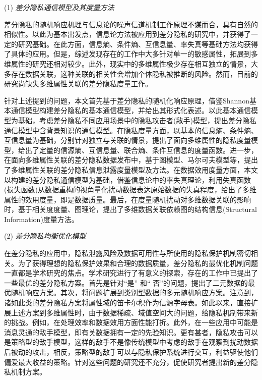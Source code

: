 (1) {\em 差分隐私通信模型及其度量方法}

差分隐私的随机响应机理与信息论的噪声信道机制工作原理不谋而合，具有自然的相似性。以此为基本出发点，信息论方法被应用到差分隐私的研究中，并获得了一定的研究基础。在此方面，信息熵、条件熵、互信息量、率失真等基础方法均获得了具体的应用。但是，综述发现存在的工作中大多针对单一的敏感属性，拓展到多维属性的研究还相对较少。此外，现实中的多维属性极少存在相互独立的情景，大多存在数据关联，这种关联的相关性会增加个体隐私被推断的风险。然而，目前的研究尚缺失多维属性关联的差分隐私度量工作。


针对上述提到的问题，本文首先基于差分隐私的随机化响应原理，借鉴Shannon基本通信模型构建差分隐私的基本通信模型，并给出其形式化表述。以此基本通信模型为基础，考虑差分隐私不同应用场景中的隐私攻击者(敌手)模型，提出差分隐私通信模型中含背景知识的通信模型。在隐私度量方面，以基本的信息熵、条件熵、互信息量为基础，分别针对独立与关联的情景，提出了面向多维属性的隐私度量模型，给出了定量的信源熵、互信息量、联合熵、条件互信息的度量函数。进一步，在面向多维属性关联的差分隐私数据发布中，基于图模型、马尔可夫模型等，提出了多维属性关联的差分隐私信息泄露度量模型及方法。在数据效用度量方面，本文以构建的差分隐私通信模型为基础，借鉴信息论中的率失真理论，利用失真函数(损失函数)从数据重构的视角量化扰动数据表达原始数据的失真程度，给出了多维属性的效用度量，即是数据质量。最后，在度量随机扰动对多维数据关联的影响时，基于相关度度量、图理论，提出了多维数据关联依赖图的结构信息(Structural Information)度量方法。



(2) {\em 差分隐私均衡优化模型}

在差分隐私的应用中，隐私泄露风险及数据可用性与所使用的隐私保护机制密切相关。为了获得理想的隐私保护效果和合理的数据质量，差分隐私的最优化机制问题一直都是学术研究的焦点。学术研究进行了有意义的探索，存在的工作中已提出了一些最优的差分隐私方案。首先是针对``是'' 和`` 否''的问题，提出了二元数据的最优随机响应方案。其次，将问题扩展到类别型数据的多元随机响应方案。注意到，诸如此类的差分隐私方案将属性域的笛卡尔积作为信源字母表。如此以来，直接扩展上述方案到多维属性时，由于数据稀疏、域值空间大的问题，给隐私机制带来新的挑战。例如，在处理效率和数据效用方面性能打折。此外，在一些应用中可能是消息灵通的敌手模型，即有关数据拥有一定的先验知识。更有甚者，隐私攻击可以是策略型的敌手模型，这样的敌手不是像传统模型中考虑的敌手在观察到扰动数据后被动的攻击，相反，策略型的敌手可以与隐私保护系统进行交互，利益驱使他们偏爱最大收益的策略\cite{alvim2017information,alvim2018leakage}。针对这些问题的研究还不充分，促使研究者提出新的差分隐私机制方案。



